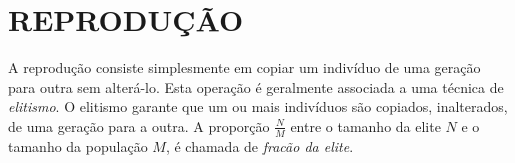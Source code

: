 \section{REPRODUÇÃO}
\label{sec:2reproducao}

A reprodução consiste simplesmente em copiar um indivíduo de uma geração para outra sem alterá-lo. Esta operação é geralmente associada a 
uma técnica de \emph{elitismo}. O elitismo garante que um ou mais indivíduos são copiados, inalterados, de uma geração para a outra. 
A proporção $\frac{N}{M}$ entre o tamanho da elite $N$ e o tamanho da população $M$, é chamada de \emph{fracão da elite}.